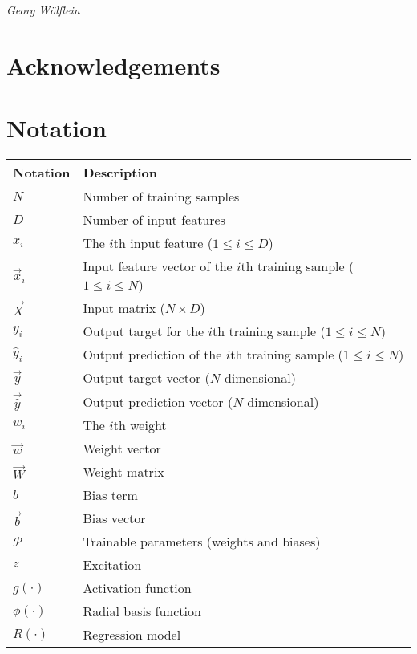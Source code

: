 \vspace{0.5cm}

\textit{Georg Wölflein}

\chapter*{Acknowledgements}
\todo

\tableofcontents
\listoffigures

\chapter*{Notation}
\begin{table}[h!]
    \centering
    \begin{tabular}{l|l}
        \hline
        Notation & Description \\
        \hline
        $N$ & Number of training samples \\
        $D$ & Number of input features \\
        $x_i$ & The $i$th input feature ($1 \leq i \leq D$) \\
        $\vec{x}_i$ & Input feature vector of the $i$th training sample ($1 \leq i \leq N$) \\
        $\vec{X}$ & Input matrix ($N \times D$) \\
        $y_i$ & Output target for the $i$th training sample ($1 \leq i \leq N$) \\
        $\hat{y}_i$ & Output prediction of the $i$th training sample ($1 \leq i \leq N$) \\
        $\vec{y}$ & Output target vector ($N$-dimensional) \\
        $\vec{\hat{y}}$ & Output prediction vector ($N$-dimensional) \\
        $w_i$ & The $i$th weight \\
        $\vec{w}$ & Weight vector \\
        $\vec{W}$ & Weight matrix \\
        $b$ & Bias term \\
        $\vec{b}$ & Bias vector \\
        $\mathscr{P}$ & Trainable parameters (weights and biases) \\
        $z$ & Excitation \\
        $g(\cdot)$ & Activation function \\
        $\phi(\cdot)$ & Radial basis function \\
        $R(\cdot)$ & Regression model \\

\end{tabular}
\end{table}

